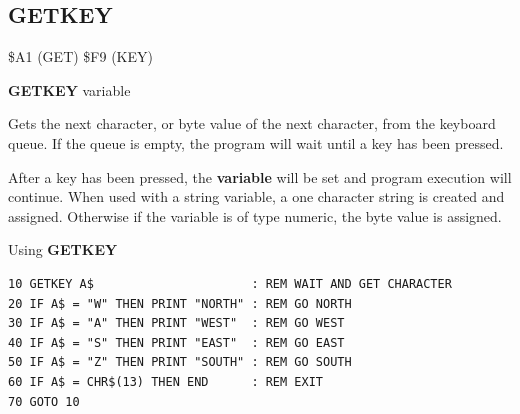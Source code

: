 \subsection{GETKEY}
\begin{description}[leftmargin=2cm,style=nextline]
\item [Token:]    \$A1 (GET) \$F9 (KEY)

\item [Format:]   {\bf GETKEY} variable

\item [Usage:]    Gets the next character, or byte value of the next character, from the keyboard queue. If the queue is empty, the program will wait until a key has been pressed.

                  After a key has been pressed, the {\bf variable} will be set and program execution will continue. When used with a string variable, a one character string is created and assigned. Otherwise if the variable is of type numeric, the byte value is assigned.

\item [Example:]  Using {\bf GETKEY}

\begin{tcolorbox}[colback=black,coltext=white]
\verbatimfont{\codefont}
\begin{verbatim}
10 GETKEY A$                      : REM WAIT AND GET CHARACTER
20 IF A$ = "W" THEN PRINT "NORTH" : REM GO NORTH
30 IF A$ = "A" THEN PRINT "WEST"  : REM GO WEST
40 IF A$ = "S" THEN PRINT "EAST"  : REM GO EAST
50 IF A$ = "Z" THEN PRINT "SOUTH" : REM GO SOUTH
60 IF A$ = CHR$(13) THEN END      : REM EXIT
70 GOTO 10
\end{verbatim}
\end{tcolorbox}
\end{description}


\newpage
